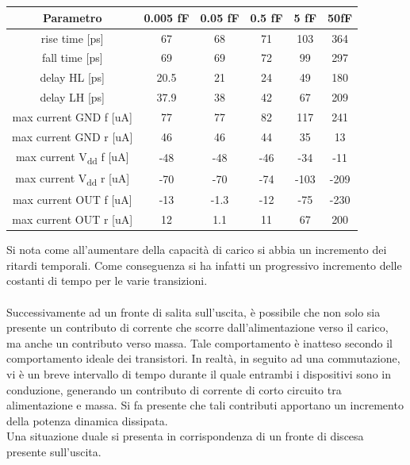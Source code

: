 \documentclass[11pt,  english, makeidx, a4paper, titlepage, oneside]{book}
\begin{document}
\\\\
\begin{center}
	\begin{tabular}{|c|c|c|c|c|c|}
	\hline
	Parametro & 0.005 fF & 0.05 fF & 0.5 fF & 5 fF & 50fF \\
	\hline
	rise time [ps] & 67 & 68 & 71 & 103 & 364\\
	\hline
	 fall time [ps] & 69 & 69 & 72 & 99 & 297 \\
	\hline
	delay HL [ps] & 20.5 & 21 & 24 & 49 & 180 \\
	\hline
	delay LH [ps] & 37.9 & 38 & 42 & 67 & 209 \\
	\hline
	max current GND f [uA] & 77 & 77 & 82 & 117 & 241 \\
	\hline
	max current GND r [uA] & 46 & 46 & 44 & 35 & 13\\
	\hline
	max current V\textsubscript{dd} f [uA] & -48 & -48 & -46 & -34 & -11\\
	\hline
	max current V\textsubscript{dd} r [uA] & -70 & -70 & -74 & -103 & -209 \\
	\hline
	max current OUT f [uA] & -13 & -1.3 & -12 & -75 & -230 \\
	\hline
	max current OUT r [uA] & 12 & 1.1 & 11 & 67 & 200\\
	\hline
	\end{tabular}	
\end{center}
\vspace{0.3cm}
Si nota come all'aumentare della capacità di carico si abbia un incremento dei ritardi temporali. Come conseguenza si ha infatti un progressivo incremento delle costanti di tempo per le varie transizioni. 
\\\\
Successivamente ad un fronte di salita sull'uscita, è possibile che non solo sia presente un contributo di corrente che scorre dall'alimentazione verso il carico, ma anche un contributo verso massa. Tale comportamento è inatteso secondo il comportamento ideale dei transistori. In realtà, in seguito ad una commutazione, vi è un breve intervallo di tempo durante il quale entrambi i dispositivi sono in conduzione, generando un contributo di corrente di corto circuito tra alimentazione e massa. Si fa presente che tali contributi apportano un incremento della potenza dinamica dissipata.
\\
Una situazione duale si presenta in corrispondenza di un fronte di discesa presente sull'uscita.
\\\\
\end{document}
